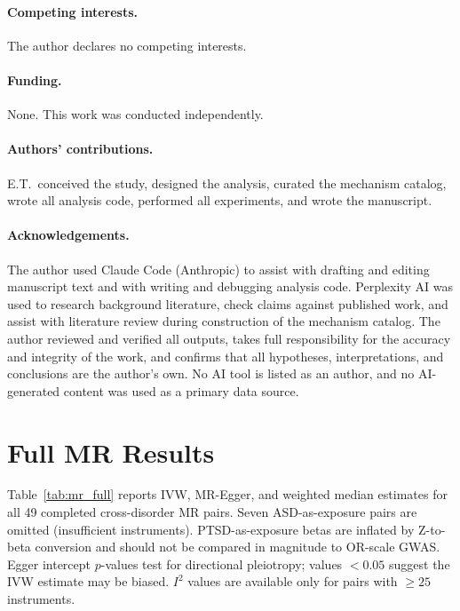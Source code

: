 \documentclass[11pt]{article}
\begin{document}
\paragraph{Competing interests.}
The author declares no competing interests.

\paragraph{Funding.}
None. This work was conducted independently.

\paragraph{Authors' contributions.}
E.T.\ conceived the study, designed the analysis, curated the mechanism catalog, wrote all analysis code, performed all experiments, and wrote the manuscript.

\paragraph{Acknowledgements.}
The author used Claude Code (Anthropic) to assist with drafting and editing manuscript text and with writing and debugging analysis code. Perplexity AI was used to research background literature, check claims against published work, and assist with literature review during construction of the mechanism catalog. The author reviewed and verified all outputs, takes full responsibility for the accuracy and integrity of the work, and confirms that all hypotheses, interpretations, and conclusions are the author's own. No AI tool is listed as an author, and no AI-generated content was used as a primary data source.




\appendix

\section{Full MR Results}
\label{app:mr}

Table~\ref{tab:mr_full} reports IVW, MR-Egger, and weighted median estimates for all 49 completed cross-disorder MR pairs. Seven ASD-as-exposure pairs are omitted (insufficient instruments). PTSD-as-exposure betas are inflated by Z-to-beta conversion and should not be compared in magnitude to OR-scale GWAS. Egger intercept $p$-values test for directional pleiotropy; values $< 0.05$ suggest the IVW estimate may be biased. $I^2$ values are available only for pairs with $\geq 25$ instruments.
\end{document}
